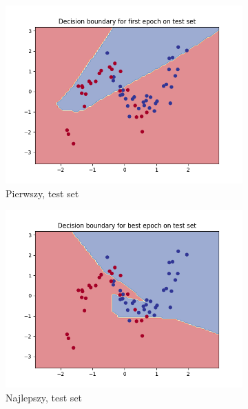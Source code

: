 \documentclass[12pt]{article}
\newcommand*{\subfigwidth}{0.24\textwidth}
\begin{document}
\begin{figure}[H]
\begin{subfigure}[t]{\subfigwidth}
        \includegraphics[width=\linewidth]{img/exp_4/set_0.8/first/test_boundary.png}
        \caption{Pierwszy, test set}
    \end{subfigure}
    \hfill
    \begin{subfigure}[t]{\subfigwidth}
        \includegraphics[width=\linewidth]{img/exp_4/set_0.8/best/test_boundary.png}
        \caption{Najlepszy, test set}
    \end{subfigure}
    \hfill
    \begin{subfigure}[t]{\subfigwidth}

\end{subfigure}
\end{figure}
\end{document}
